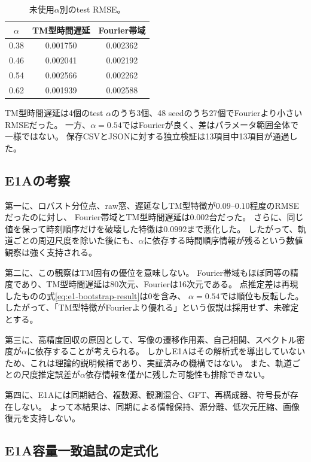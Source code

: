\documentclass[a4paper,11pt]{jlreq}
\begin{document}
\begin{table}[htbp]
\centering
\small
\caption{未使用$\alpha$別のtest RMSE。}
\label{tab:e1-alpha-results}
\begin{tabular}{ccc}
\toprule
$\alpha$ & TM型時間遅延 & Fourier帯域 \\
\midrule
0.38 & 0.001750 & 0.002362 \\
0.46 & 0.002041 & 0.002192 \\
0.54 & 0.002566 & 0.002262 \\
0.62 & 0.001939 & 0.002588 \\
\bottomrule
\end{tabular}
\end{table}

TM型時間遅延は4個のtest $\alpha$のうち3個、48 seedのうち27個でFourierより小さいRMSEだった。
一方、$\alpha=0.54$ではFourierが良く、差はパラメータ範囲全体で一様ではない。
保存CSVとJSONに対する独立検証は13項目中13項目が通過した。

\subsection{E1Aの考察}

第一に、ロバスト分位点、raw窓、遅延なしTM型特徴が$0.09$--$0.10$程度のRMSEだったのに対し、
Fourier帯域とTM型時間遅延は$0.002$台だった。
さらに、同じ値を保って時刻順序だけを破壊した特徴は$0.0992$まで悪化した。
したがって、軌道ごとの周辺尺度を除いた後にも、$\alpha$に依存する時間順序情報が残るという数値観察は強く支持される。

第二に、この観察はTM固有の優位を意味しない。
Fourier帯域もほぼ同等の精度であり、TM型時間遅延は80次元、Fourierは16次元である。
点推定差は再現したものの式\eqref{eq:e1-bootstrap-result}は0を含み、
$\alpha=0.54$では順位も反転した。
したがって、「TM型特徴がFourierより優れる」という仮説は採用せず、未確定とする。

第三に、高精度回収の原因として、写像の遷移作用素、自己相関、スペクトル密度が$\alpha$に依存することが考えられる。
しかしE1Aはその解析式を導出していないため、これは理論的説明候補であり、実証済みの機構ではない。
また、軌道ごとの尺度推定誤差が$\alpha$依存情報を僅かに残した可能性も排除できない。

第四に、E1Aには同期結合、複数源、観測混合、GFT、再構成器、符号長が存在しない。
よって本結果は、同期による情報保持、源分離、低次元圧縮、画像復元を支持しない。

\subsection{E1A容量一致追試の定式化}
\end{document}
